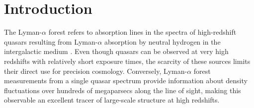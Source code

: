 \documentclass{aa}
\newcommand{\lya}{Lyman-$\alpha$\xspace}
\newcommand{\lyaf}{Lyman-$\alpha$ forest\xspace}
\begin{document}




\maketitle



\section{Introduction}

The \lyaf refers to absorption lines in the spectra of high-redshift quasars resulting from \lya absorption by neutral hydrogen in the intergalactic medium \citep[IGM; for a review, see][]{mcquinn2016EvolutionIntergalacticMedium}. Even though quasars can be observed at very high redshifts with relatively short exposure times, the scarcity of these sources limits their direct use for precision cosmology. Conversely, \lyaf measurements from a single quasar spectrum provide information about density fluctuations over hundreds of megaparsecs along the line of sight, making this observable an excellent tracer of large-scale structure at high redshifts.
\end{document}

